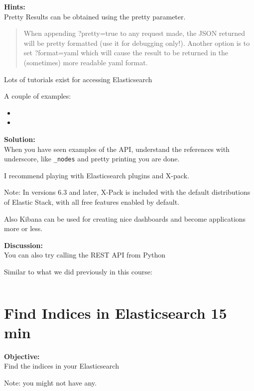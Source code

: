 \documentclass[a4paper,11pt,notitlepage]{report}
\begin{document}
{\bf Hints:}\\
Pretty Results can be obtained using the pretty parameter.
\begin{quote}
When appending ?pretty=true to any request made, the JSON returned will be pretty formatted (use it for debugging only!). Another option is to set ?format=yaml which will cause the result to be returned in the (sometimes) more readable yaml format.
\end{quote}

Lots of tutorials exist for accessing Elasticsearch

A couple of examples:
\begin{itemize}
\item {}
\item {}
\end{itemize}

{\bf Solution:}\\
When you have seen examples of the API, understand the references with underscore, like \verb+_nodes+ and pretty printing you are done.

I recommend playing with Elasticsearch plugins and X-pack.\\

Note: In versions 6.3 and later, X-Pack is included with the default distributions of Elastic Stack, with all free features enabled by default.

Also Kibana can be used for creating nice dashboards and become applications more or less.

{\bf Discussion:}\\
You can also try calling the REST API from Python

Similar to what we did previously in this course:
\inputminted{python}{programs/rest-1.py}



\chapter{Find Indices in Elasticsearch 15 min}
\label{ex:es-find-indices}

{\bf Objective:}\\
Find the indices in your Elasticsearch

Note: you might not have any.
\end{document}
